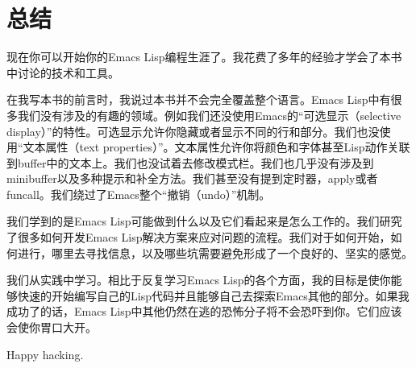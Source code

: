 \chapter{总结}
\label{chapter:A-Conclusion}

现在你可以开始你的Emacs Lisp编程生涯了。我花费了多年的经验才学会了本书中讨论的技术和工具。

在我写本书的前言时，我说过本书并不会完全覆盖整个语言。Emacs Lisp中有很多我们没有涉及的有趣的领域。例如我们还没使用Emacs的“可选显示（selective display）”的特性。可选显示允许你隐藏或者显示不同的行和部分。我们也没使用“文本属性（text properties）”。文本属性允许你将颜色和字体甚至Lisp动作关联到buffer中的文本上。我们也没试着去修改模式栏。我们也几乎没有涉及到minibuffer以及多种提示和补全方法。我们甚至没有提到定时器，apply或者funcall。我们绕过了Emacs整个“撤销（undo）”机制。

我们学到的是Emacs Lisp可能做到什么以及它们看起来是怎么工作的。我们研究了很多如何开发Emacs Lisp解决方案来应对问题的流程。我们对于如何开始，如何进行，哪里去寻找信息，以及哪些坑需要避免形成了一个良好的、坚实的感觉。

我们从实践中学习。相比于反复学习Emacs Lisp的各个方面，我的目标是使你能够快速的开始编写自己的Lisp代码并且能够自己去探索Emacs其他的部分。如果我成功了的话，Emacs Lisp中其他仍然在逃的恐怖分子将不会恐吓到你。它们应该会使你胃口大开。

Happy hacking.
